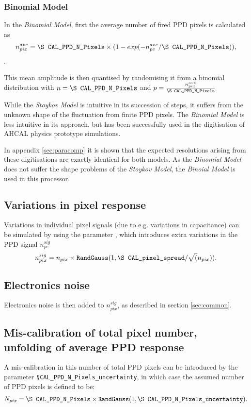 \documentclass[12pt]{article} %
\begin{document}
\subsubsection*{Binomial Model}
In the \emph{Binomial Model}, first the average number of fired PPD pixels is calculated as 
\begin{equation*}
{n}_{pix}^{ave} = \text{\tt \S CAL\_PPD\_N\_Pixels} \times ( 1 - exp ( -n_{pe}^{ave} / \text{\tt \S CAL\_PPD\_N\_Pixels}  ) ), 
\end{equation*}.

This mean amplitude is then quantised by randomising it from a binomial distribution with $n=\text{\tt \S CAL\_PPD\_N\_Pixels}$ and $p=\frac{{n}_{pix}^{ave}}{\text{\tt \S CAL\_PPD\_N\_Pixels}}$

While the \emph{Stoykov Model} is intuitive in its succession of steps, it suffers from the unknown shape of the fluctuation from finite PPD pixels. The \emph{Binomial Model} is less intuitive in its approach, but has been successfully used in the digitisation of AHCAL physics prototype simulations.

In appendix \autoref{sec:paracomp} it is shown that the expected resolutions arising from these digitisations are exactly identical for both models. As the \emph{Binomial Model} does not suffer the shape problems of the \emph{Stoykov Model}, the \emph{Binoial Model} is used in this processor.

\subsection*{Variations in pixel response}
Variations in individual pixel signals (due to e.g. variations in capacitance) can be simulated by using the parameter
, which introduces extra variations in the PPD signal $n_{pe}^{sig}$
\begin{equation*}
n_{pix}^{sig} = n_{pix} \times \text{\tt RandGauss} ( 1, \text{\tt \S CAL\_pixel\_spread} / \sqrt( n_{pix} ) ).
\end{equation*}

\subsection*{Electronics noise}
Electronics noise is then added to $n_{pix}^{sig}$, as described in section \ref{sec:common}.

\subsection*{Mis-calibration of total pixel number, unfolding of average PPD response}
A mis-calibration in this number of 
total PPD pixels can be introduced by the parameter {\tt \S CAL\_PPD\_N\_Pixels\_uncertainty}, in which
case the assumed number of PPD pixels is defined to be:
\begin{equation*}
N_{pix} = \text{\tt \S CAL\_PPD\_N\_Pixels} \times 
\text{\tt RandGauss}(1, \text{\tt \S CAL\_PPD\_N\_Pixels\_uncertainty}).
\end{equation*}
\end{document}
